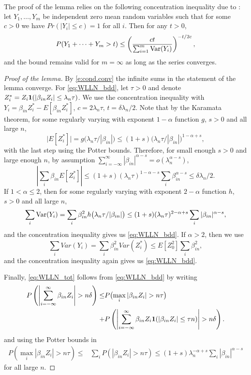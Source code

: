 \documentclass[11pt,reqno]{amsart}
\numberwithin{equation}{section}
\theoremstyle{definition}
\theoremstyle{remark}
\theoremstyle{definition}
\newcommand{\one}{{\bf 1}}
\newcommand{\Var}{{\rm Var}}
\begin{document}
The proof of the lemma relies on the following concentration
inequality due to \cite{prokhorov:1959}: let $Y_1,\ldots, Y_m$ be
independent zero mean random variables 
   such that for some $c>0$ we have 
   $Pr(|Y_i|\leq c) = 1$ for all $i$. Then for any $t> 0$, 
   $$P(Y_1+ \cdots + Y_m>t)\leq \left(\frac{ct}{\sum_{i=1}^m \Var(Y_i)}\right)^{-t/2c},$$
and the bound remains valid for $m=\infty$ as long as the series
converges. 
\begin{proof}[Proof of the lemma] 
By \eqref{e:cond.conv} the infinite sums in the statement of the lemma
converge. For \eqref{eq:WLLN_bdd}, let $\tau>0$ and denote $Z_i^* =
Z_i\one(|\beta_{in}Z_i| \leq \lambda_n \tau)$. We use the
concentration inequality with $Y_i = \beta_{in} Z_i^* - E[\beta_{in}
Z_i^*]$, $c = 2\lambda_n \tau, \, t = \delta \lambda_n /2$.  Note that
by the Karamata theorem, for some regularly varying with exponent
$1-\alpha$ function $g$, $s>0$ and all large $n$, 
$$
\big| E[Z_i^*]\big|  = g\bigl(\lambda_n\tau/|\beta_{in}|\bigr) \leq (1+s)
\bigl(\lambda_n\tau/|\beta_{in}|\bigr)^{1-\alpha + s},
$$ 
with the last step using the Potter bounds. Therefore, for small
enough $s>0$ and large enough $n$, by assumption $\sum_{i = -\infty}^\infty |\beta_{in}|^{\alpha - s} = o(\lambda_n^{\alpha -s})$,
$$
\left|\sum_{i} \beta_{in} E[Z_i^*]\right| \leq
(1+s)(\lambda_n\tau)^{1-\alpha -s} \sum_i \beta_{in}^{\alpha - s}
\leq \delta \lambda_n/2.
$$
If  $1< \alpha \leq 2$, then for some regularly varying with exponent
$2-\alpha$ function $h$, $s>0$ and all large $n$, 
\begin{align*}
    \sum_i \Var(Y_i) = \sum_{i} \beta_{in}^2h\bigl(
  \lambda_n\tau/|\beta_{in}|\bigr) \leq (1+s)(\lambda_n\tau)^{2-\alpha
  + s} \sum_i |\beta_{in}|^{\alpha - s},
\end{align*}
and the concentration inequality gives us \eqref{eq:WLLN_bdd}. If
$\alpha > 2$, then we use 
$$
\sum_i Var(Y_i) = \sum_i \beta_{in}^2 Var(Z_i^*)  \leq E[Z_0^2] \sum_i
\beta_{in}^2, 
$$
and the concentration inequality again gives us \eqref{eq:WLLN_bdd}.

Finally, \eqref{eq:WLLN_tot}  follows from \eqref{eq:WLLN_bdd} by
writing 
\begin{align*}
 P\left( \left| \sum_{i=-\infty}^\infty \beta_{in} Z_i
       \right| > n\delta\right) \leq& P\bigl( \max_i |\beta_{in}Z_i| >
  n\tau \bigr) \\
+& P\left( \left| \sum_{i=-\infty}^\infty \beta_{in} Z_i
        \one(|\beta_{in}Z_i|\leq \tau n)\right| > n\delta\right).
\end{align*}
and using the Potter bounds in 
\begin{align*}
    P(\max_i |\beta_{in} Z_i |> n\tau)\leq& \sum_{i} P(|\beta_{in} Z_i |> n\tau) 
\leq (1+s) \lambda_n^{-\alpha  + s} \sum_{i}
     |\beta_{in}|^{\alpha-s}
\end{align*}
for all large $n$.     
\end{proof}
\end{document}
